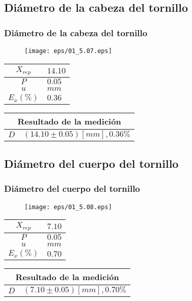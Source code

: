 \documentclass[letter,11pt]{beamer}
\begin{document}
\subsection{Diámetro de la cabeza del tornillo}
\begin{frame}
\frametitle{Diámetro de la cabeza del tornillo}
\vspace*{0.8cm}
\begin{figure}
\centering
\texttt{[image: eps/01\_5.07.eps]}
\end{figure}
\vspace*{0.4cm}
\scriptsize
\begin{tabular}{|c|>{\centering}m{1.8cm}<{\centering}|}
\hline
$X_{rep}$ &  $14.10$ \tabularnewline \hline
      $P$ &   $0.05$ \tabularnewline \hline
      $u$ &     $mm$ \tabularnewline \hline
$E_x(\%)$ &   $0.36$ \tabularnewline \hline
\end{tabular}
\quad
\begin{tabular}{|c|>{\centering}m{5.7cm}<{\centering}|}
\hline
\multicolumn{2}{|c|}{\textbf{Resultado de la medición}} \\ \hline
$D$ & $( 14.10\pm0.05)[mm], 0.36\%$ \tabularnewline \hline
\end{tabular}
\end{frame}

\subsection{Diámetro del cuerpo del tornillo}
\begin{frame}
\frametitle{Diámetro del cuerpo del tornillo}
\vspace*{0.8cm}
\begin{figure}
\centering
\texttt{[image: eps/01\_5.08.eps]}
\end{figure}
\vspace*{0.4cm}
\scriptsize
\begin{tabular}{|c|>{\centering}m{1.8cm}<{\centering}|}
\hline
$X_{rep}$ &   $7.10$ \tabularnewline \hline
      $P$ &   $0.05$ \tabularnewline \hline
      $u$ &     $mm$ \tabularnewline \hline
$E_x(\%)$ &   $0.70$ \tabularnewline \hline
\end{tabular}
\quad
\begin{tabular}{|c|>{\centering}m{5.7cm}<{\centering}|}
\hline
\multicolumn{2}{|c|}{\textbf{Resultado de la medición}} \\ \hline
$D$ & $(  7.10\pm0.05)[mm], 0.70\%$ \tabularnewline \hline
\end{tabular}
\end{frame}
\end{document}
